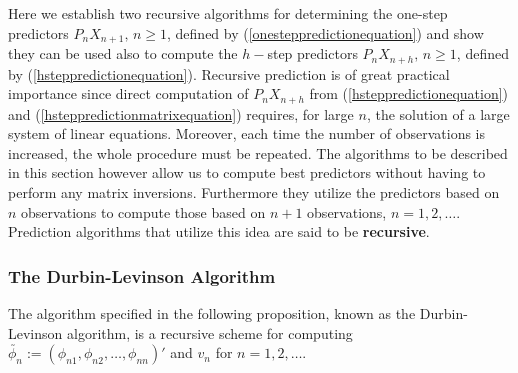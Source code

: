 \documentclass[11pt, a4paper]{article}
\numberwithin{equation}{section}
\theoremstyle{definition}
\begin{document}
Here we establish two recursive algorithms for determining the one-step predictors $P_nX_{n+1}, \, n \geq 1$, defined by (\ref{onesteppredictionequation}) and show they can be used also to compute the $h-$step predictors $P_nX_{n+h}, \, n \geq 1$, defined by (\ref{hsteppredictionequation}). Recursive prediction is of great practical importance since direct computation of $P_nX_{n+h}$ from (\ref{hsteppredictionequation}) and (\ref{hsteppredictionmatrixequation}) requires, for large $n$, the solution of a large system of linear equations. Moreover, each time the number of observations is increased, the whole procedure must be repeated. The algorithms to be described in this section however allow us to compute best predictors without having to perform any matrix inversions. Furthermore they utilize the predictors based on $n$ observations to compute those based on $n+1$ observations, $n = 1, 2, \ldots$. Prediction algorithms that utilize this idea are said to be \textbf{recursive}.

\subsubsection{The Durbin-Levinson Algorithm}

The algorithm specified in the following proposition, known as the Durbin-Levinson algorithm, is a recursive scheme for computing $\utilde{\phi_n} := \left( \phi_{n1}, \phi_{n2}, \ldots, \phi_{nn} \right)'$ and $v_n$ for $n = 1, 2, \ldots$.
\end{document}
